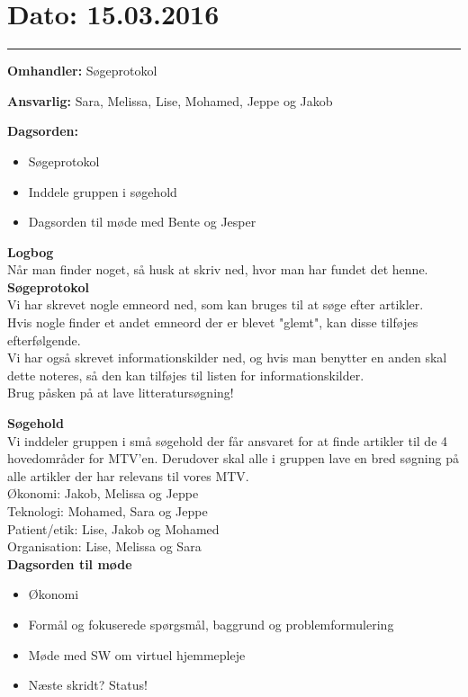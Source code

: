 \section{Dato: 15.03.2016}
\hrule

\textbf{Omhandler:} Søgeprotokol

\textbf{Ansvarlig:} Sara, Melissa, Lise, Mohamed, Jeppe og Jakob

\textbf{Dagsorden:}
\begin{itemize}
	\item Søgeprotokol
	\item Inddele gruppen i søgehold
	\item Dagsorden til møde med Bente og Jesper
\end{itemize}

\textbf{Logbog}
\\
Når man finder noget, så husk at skriv ned, hvor man har fundet det henne. \\ 

\textbf{Søgeprotokol}
\\
Vi har skrevet nogle emneord ned, som kan bruges til at søge efter artikler. \\
Hvis nogle finder et andet emneord der er blevet "glemt", kan disse tilføjes efterfølgende.\\
Vi har også skrevet informationskilder ned, og hvis man benytter en anden skal dette noteres, så den kan tilføjes til listen for informationskilder.\\
Brug påsken på at lave litteratursøgning!

\textbf{Søgehold}
\\
Vi inddeler gruppen i små søgehold der får ansvaret for at finde artikler til de 4 hovedområder for MTV'en.
Derudover skal alle i gruppen lave en bred søgning på alle artikler der har relevans til vores MTV.\\
Økonomi: Jakob, Melissa og Jeppe\\
Teknologi: Mohamed, Sara og Jeppe\\
Patient/etik: Lise, Jakob og Mohamed\\
Organisation: Lise, Melissa og Sara \\

\textbf{Dagsorden til møde}
\\
\begin{itemize}
	\item Økonomi
	\item Formål og fokuserede spørgsmål, baggrund og problemformulering
	\item Møde med SW om virtuel hjemmepleje
	\item Næste skridt? Status!
\end{itemize}
\\
\\
